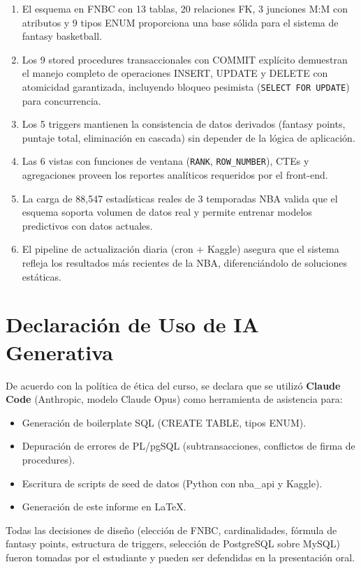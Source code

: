 \documentclass[12pt,a4paper]{article}
\begin{document}
\begin{enumerate}
    \item El esquema en FNBC con 13 tablas, 20 relaciones FK, 3 junciones M:M con atributos
          y 9 tipos ENUM proporciona una base s\'olida para el sistema de fantasy basketball.

    \item Los 9 stored procedures transaccionales con COMMIT expl\'icito demuestran el manejo
          completo de operaciones INSERT, UPDATE y DELETE con atomicidad garantizada,
          incluyendo bloqueo pesimista (\texttt{SELECT FOR UPDATE}) para concurrencia.

    \item Los 5 triggers mantienen la consistencia de datos derivados (fantasy points, puntaje
          total, eliminaci\'on en cascada) sin depender de la l\'ogica de aplicaci\'on.

    \item Las 6 vistas con funciones de ventana (\texttt{RANK}, \texttt{ROW\_NUMBER}), CTEs
          y agregaciones proveen los reportes anal\'iticos requeridos por el front-end.

    \item La carga de 88,547 estad\'isticas reales de 3 temporadas NBA valida que el esquema
          soporta volumen de datos real y permite entrenar modelos predictivos con datos actuales.

    \item El pipeline de actualizaci\'on diaria (cron + Kaggle) asegura que el sistema refleja
          los resultados m\'as recientes de la NBA, diferenci\'andolo de soluciones est\'aticas.
\end{enumerate}

\section{Declaraci\'on de Uso de IA Generativa}

De acuerdo con la pol\'itica de \'etica del curso, se declara que se utiliz\'o \textbf{Claude Code}
(Anthropic, modelo Claude Opus) como herramienta de asistencia para:

\begin{itemize}[nosep]
    \item Generaci\'on de boilerplate SQL (CREATE TABLE, tipos ENUM).
    \item Depuraci\'on de errores de PL/pgSQL (subtransacciones, conflictos de firma de procedures).
    \item Escritura de scripts de seed de datos (Python con nba\_api y Kaggle).
    \item Generaci\'on de este informe en \LaTeX.
\end{itemize}

Todas las decisiones de dise\~no (elecci\'on de FNBC, cardinalidades, f\'ormula de fantasy points,
estructura de triggers, selecci\'on de PostgreSQL sobre MySQL) fueron tomadas por el estudiante
y pueden ser defendidas en la presentaci\'on oral.
\end{document}
